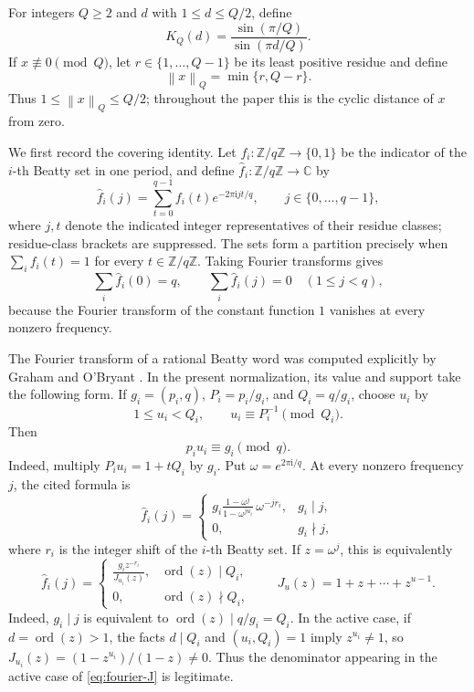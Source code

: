 \documentclass[11pt]{article}
\theoremstyle{definition}
\theoremstyle{remark}
\newcommand{\Z}{\mathbb Z}
\newcommand{\normQ}[1]{\left\lVert #1\right\rVert_Q}
\newcommand{\ii}{\mathrm i}
\begin{document}
For integers \(Q\ge2\) and \(d\) with \(1\le d\le Q/2\), define
\begin{equation}\label{eq:kernel-def}
 K_Q(d)=\frac{\sin(\pi/Q)}{\sin(\pi d/Q)}.
\end{equation}
If \(x\not\equiv0\pmod Q\), let \(r\in\{1,\ldots,Q-1\}\) be its least
positive residue and define
\[
 \normQ{x}=\min\{r,Q-r\}.
\]
Thus \(1\le\normQ{x}\le Q/2\); throughout the paper this is the cyclic
distance of \(x\) from zero.

We first record the covering identity.  Let
\(f_i:\Z/q\Z\to\{0,1\}\) be the indicator
of the \(i\)-th Beatty set in one period, and define
\(\widehat f_i:\Z/q\Z\to\mathbb C\) by
\[
 \widehat f_i(j)=\sum_{t=0}^{q-1}f_i(t)e^{-2\pi\ii jt/q},
 \qquad j\in\{0,\ldots,q-1\},
\]
where \(j,t\) denote the indicated integer representatives of their
residue classes; residue-class brackets are suppressed.
The sets form a partition precisely when
\(\sum_i f_i(t)=1\) for every \(t\in\Z/q\Z\).  Taking Fourier transforms
gives
\[
 \sum_i\widehat f_i(0)=q,
 \qquad
 \sum_i\widehat f_i(j)=0\quad(1\le j<q),
\]
because the Fourier transform of the constant function \(1\) vanishes at
every nonzero frequency.

The Fourier transform of a rational Beatty word was computed explicitly by
Graham and O'Bryant \cite[Theorem~1.1]{GrahamOBryant2005}.  In the present
normalization, its value and support take the following form.  If
\(g_i=(p_i,q)\), \(P_i=p_i/g_i\), and \(Q_i=q/g_i\), choose \(u_i\) by
\[
 1\le u_i<Q_i,\qquad u_i\equiv P_i^{-1}\pmod{Q_i}.
\]
Then
\begin{equation}\label{eq:inverse-lift}
 p_i u_i\equiv g_i\pmod q.
\end{equation}
Indeed, multiply \(P_i u_i=1+tQ_i\) by \(g_i\).
Put \(\omega=e^{2\pi\ii/q}\).  At every nonzero frequency \(j\), the
cited formula is
\begin{equation}\label{eq:fourier-exact}
 \widehat f_i(j)=
 \begin{cases}
 \displaystyle
 g_i\frac{1-\omega^j}{1-\omega^{ju_i}}\,\omega^{-jr_i},
   &g_i\mid j,\\[6pt]
 0,&g_i\nmid j,
 \end{cases}
\end{equation}
where \(r_i\) is the integer shift of the \(i\)-th Beatty set.  If
\(z=\omega^j\), this is equivalently
\begin{equation}\label{eq:fourier-J}
 \widehat f_i(j)=
 \begin{cases}
 \displaystyle\frac{g_i z^{-r_i}}{J_{u_i}(z)},
   &\operatorname{ord}(z)\mid Q_i,\\[6pt]
 0,&\operatorname{ord}(z)\nmid Q_i,
 \end{cases}
 \qquad J_u(z)=1+z+\cdots+z^{u-1}.
\end{equation}
Indeed, \(g_i\mid j\) is equivalent to
\(\operatorname{ord}(z)\mid q/g_i=Q_i\).  In the active case, if
\(d=\operatorname{ord}(z)>1\), the facts \(d\mid Q_i\) and
\((u_i,Q_i)=1\) imply \(z^{u_i}\ne1\), so
\(J_{u_i}(z)=(1-z^{u_i})/(1-z)\ne0\).  Thus the denominator appearing
in the active case of \eqref{eq:fourier-J} is legitimate.
\end{document}
